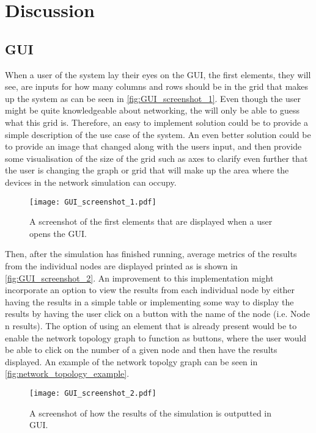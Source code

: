 \chapter{Discussion}\label{ch:Discussion}


\section{GUI}
When a user of the system lay their eyes on the GUI, the first elements, they will see, are inputs for how many columns and rows should be in the grid that makes up the system as can be seen in \autoref{fig:GUI_screenshot_1}. Even though the user might be quite knowledgeable about networking, the will only be able to guess what this grid is. Therefore, an easy to implement solution could be to provide a simple description of the use case of the system. An even better solution could be to provide an image that changed along with the users input, and then provide some visualisation of the size of the grid such as axes to clarify even further that the user is changing the graph or grid that will make up the area where the devices in the network simulation can occupy.

\begin{figure}[H]
  \centering
  \texttt{[image: GUI\_screenshot\_1.pdf]}
  \caption{A screenshot of the first elements that are displayed when a user opens the GUI.}
  \label{fig:GUI_screenshot_1}
\end{figure}

Then, after the simulation has finished running, average metrics of the results from the individual nodes are displayed printed as is shown in \autoref{fig:GUI_screenshot_2}. An improvement to this implementation might incorporate an option to view the results from each individual node by either having the results in a simple table or implementing some way to display the results by having the user click on a button with the name of the node (i.e. Node n results). The option of using an element that is already present would be to enable the network topology graph to function as buttons, where the user would be able to click on the number of a given node and then have the results displayed. An example of the network topolgy graph can be seen in \autoref{fig:network_topology_example}.

\begin{figure}[H]
  \centering
  \texttt{[image: GUI\_screenshot\_2.pdf]}
  \caption{A screenshot of how the results of the simulation is outputted in GUI.}
  \label{fig:GUI_screenshot_2}
\end{figure}

